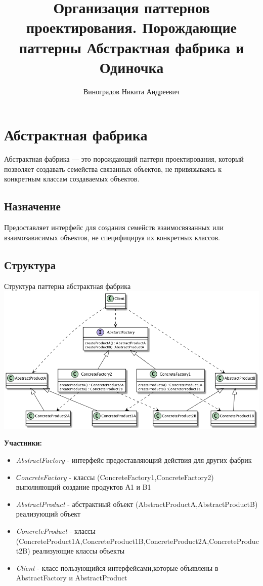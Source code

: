 \documentclass[PI,LAB]{HSEUniversity}
\title{Организация паттернов проектирования. Порождающие паттерны Абстрактная фабрика и Одиночка }
\author{Виноградов Никита Андреевич}
\begin{document}
\maketitle



\chapter{Абстрактная фабрика}
Абстрактная фабрика — это порождающий паттерн проектирования, который позволяет создавать семейства связанных объектов, не привязываясь к конкретным классам создаваемых объектов.
\section{Назначение}
Предоставляет интерфейс для создания семейств взаимосвязанных или взаимозависимых объектов, не специфицируя их конкретных классов. 
\section{Структура}

\begin{FIGURE}[h]{Структура паттерна абстрактная фабрика\label{fig:example-figure}}
	\includegraphics[width=\textwidth]{out/diagrams/factory/flex}
\end{FIGURE}

\textbf{Участники:}
\begin{itemize}
	\item \emph{AbstractFactory} - интерфейс предоставляющий действия для других фабрик
	\item \emph{СoncreteFactory} - классы (ConcreteFactory1,ConcreteFactory2) выполняющий создание продуктов А1 и B1
	\item \emph{AbstractProduct} - абстрактный объект (AbstractProductA,AbstractProductB) реализующий объект
	\item \emph{ConcreteProduct} - классы (ConcreteProduct1A,ConcreteProduct1B,ConcreteProduct2A,ConcreteProduct2B)  реализующие классы объекты
	\item \emph{Client} - класс пользующийся интерфейсами,которые объявлены в AbstractFactory и AbstractProduct
\end{itemize}
\end{document}

